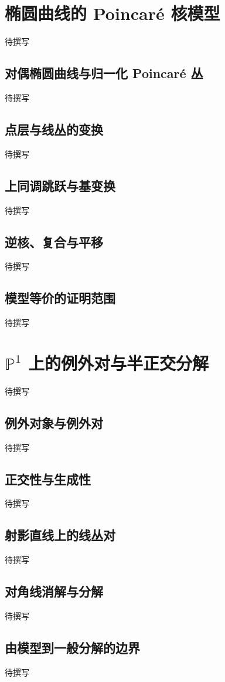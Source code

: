 \section{椭圆曲线的 Poincaré 核模型}
\label{g5:sec:D03}
待撰写

\subsection{对偶椭圆曲线与归一化 Poincaré 丛}
\label{g5:subsec:D03:01}
待撰写

\subsection{点层与线丛的变换}
\label{g5:subsec:D03:02}
待撰写

\subsection{上同调跳跃与基变换}
\label{g5:subsec:D03:03}
待撰写

\subsection{逆核、复合与平移}
\label{g5:subsec:D03:04}
待撰写

\subsection{模型等价的证明范围}
\label{g5:subsec:D03:05}
待撰写

\section{\texorpdfstring{\(\mathbb P^1\) 上的例外对与半正交分解}{P¹ 上的例外对与半正交分解}}
\label{g5:sec:D04}
待撰写

\subsection{例外对象与例外对}
\label{g5:subsec:D04:01}
待撰写

\subsection{正交性与生成性}
\label{g5:subsec:D04:02}
待撰写

\subsection{射影直线上的线丛对}
\label{g5:subsec:D04:03}
待撰写

\subsection{对角线消解与分解}
\label{g5:subsec:D04:04}
待撰写

\subsection{由模型到一般分解的边界}
\label{g5:subsec:D04:05}
待撰写
